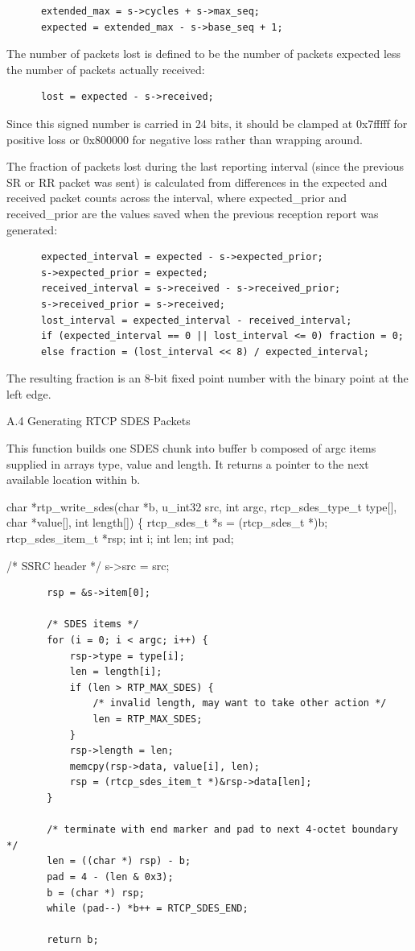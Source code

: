 \documentclass{article}
\begin{document}
\begin{verbatim}
      extended_max = s->cycles + s->max_seq;
      expected = extended_max - s->base_seq + 1;
\end{verbatim}

The number of packets lost is defined to be the number of packets expected less the number of packets actually received:

\begin{verbatim}
      lost = expected - s->received;
\end{verbatim}

Since this signed number is carried in 24 bits, it should be clamped at 0x7fffff for positive loss or 0x800000 for negative loss rather than wrapping around.

The fraction of packets lost during the last reporting interval (since the previous SR or RR packet was sent) is calculated from differences in the expected and received packet counts across the interval, where expected\_prior and received\_prior are the values saved when the previous reception report was generated:

\begin{verbatim}
      expected_interval = expected - s->expected_prior;
      s->expected_prior = expected;
      received_interval = s->received - s->received_prior;
      s->received_prior = s->received;
      lost_interval = expected_interval - received_interval;
      if (expected_interval == 0 || lost_interval <= 0) fraction = 0;
      else fraction = (lost_interval << 8) / expected_interval;
\end{verbatim}

The resulting fraction is an 8-bit fixed point number with the binary point at the left edge.

A.4 Generating RTCP SDES Packets

This function builds one SDES chunk into buffer b composed of argc items supplied in arrays type, value and length.  It returns a pointer to the next available location within b.

char *rtp\_write\_sdes(char *b, u\_int32 src, int argc, rtcp\_sdes\_type\_t type[], char *value[], int length[]) \{ rtcp\_sdes\_t *s = (rtcp\_sdes\_t *)b; rtcp\_sdes\_item\_t *rsp; int i; int len; int pad;

/* SSRC header */ s->src = src;

\begin{verbatim}
       rsp = &s->item[0];

       /* SDES items */
       for (i = 0; i < argc; i++) {
           rsp->type = type[i];
           len = length[i];
           if (len > RTP_MAX_SDES) {
               /* invalid length, may want to take other action */
               len = RTP_MAX_SDES;
           }
           rsp->length = len;
           memcpy(rsp->data, value[i], len);
           rsp = (rtcp_sdes_item_t *)&rsp->data[len];
       }

       /* terminate with end marker and pad to next 4-octet boundary */
       len = ((char *) rsp) - b;
       pad = 4 - (len & 0x3);
       b = (char *) rsp;
       while (pad--) *b++ = RTCP_SDES_END;

       return b;
\end{verbatim}
\end{document}
